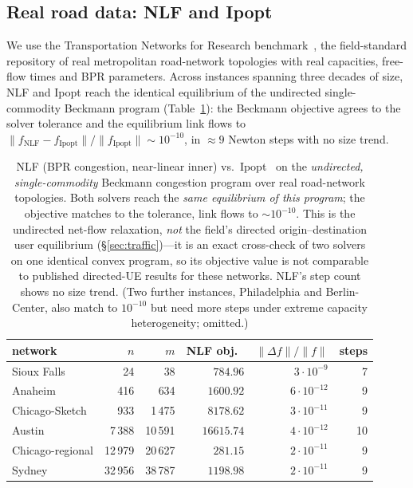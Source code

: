 \documentclass{siamart220329}
\begin{document}
\subsection{Real road data: NLF and Ipopt}\label{sec:bprvalid}
We use the Transportation Networks for Research benchmark~\cite{tntp}, the field-standard
repository of real metropolitan road-network topologies with real capacities, free-flow times and BPR
parameters. Across instances spanning three decades of size, NLF and Ipopt reach the identical
equilibrium of the undirected single-commodity Beckmann program
(Table~\ref{tab:bprvalid}): the Beckmann objective agrees to the solver tolerance and the
equilibrium link flows to $\|f_{\mathrm{NLF}}-f_{\mathrm{Ipopt}}\|/\|f_{\mathrm{Ipopt}}\|\sim10^{-10}$,
in $\approx9$ Newton steps with no size trend.

\begin{table}[t]\centering\small
\caption{NLF (BPR congestion, near-linear inner) vs.\ Ipopt~\cite{tntp} on the \emph{undirected,
single-commodity} Beckmann congestion program over real road-network topologies. Both solvers reach
the \emph{same equilibrium of this program}; the objective matches to the tolerance, link flows to
$\sim10^{-10}$. This is the undirected net-flow relaxation, \emph{not} the field's directed
origin--destination user equilibrium (\S\ref{sec:traffic})---it is an exact cross-check of two solvers
on one identical convex program, so its objective value is not comparable to published directed-UE
results for these networks. NLF's step count shows no size trend. (Two further instances,
Philadelphia and Berlin-Center, also match to $10^{-10}$ but need more steps under extreme capacity
heterogeneity; omitted.)}\label{tab:bprvalid}
\begin{tabular}{lrrrrr}
\toprule
network & $n$ & $m$ & NLF obj.\ & $\|\Delta f\|/\|f\|$ & steps\\
\midrule
Sioux Falls       & 24     & 38     & $784.96$    & $3{\cdot}10^{-9}$  & 7\\
Anaheim           & 416    & 634    & $1600.92$   & $6{\cdot}10^{-12}$ & 9\\
Chicago-Sketch    & 933    & 1\,475 & $8178.62$   & $3{\cdot}10^{-11}$ & 9\\
Austin            & 7\,388 & 10\,591& $16615.74$  & $4{\cdot}10^{-12}$ & 10\\
Chicago-regional  & 12\,979& 20\,627& $281.15$    & $2{\cdot}10^{-11}$ & 9\\
Sydney            & 32\,956& 38\,787& $1198.98$   & $2{\cdot}10^{-11}$ & 9\\
\bottomrule
\end{tabular}
\end{table}
\end{document}
